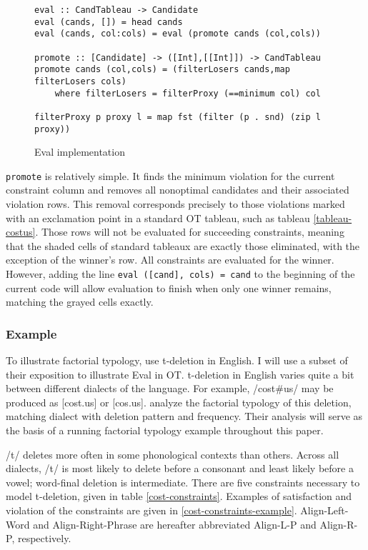 \documentclass[11pt]{article}
\begin{document}
\begin{figure}
\begin{verbatim}
eval :: CandTableau -> Candidate
eval (cands, []) = head cands
eval (cands, col:cols) = eval (promote cands (col,cols))

promote :: [Candidate] -> ([Int],[[Int]]) -> CandTableau
promote cands (col,cols) = (filterLosers cands,map filterLosers cols)
    where filterLosers = filterProxy (==minimum col) col

filterProxy p proxy l = map fst (filter (p . snd) (zip l proxy))
\end{verbatim}
  \caption{ {\sc Eval} implementation}
  \label{eval-algorithm}
\end{figure}

{\tt promote} is relatively simple. It finds the minimum violation for the
current constraint column and removes all nonoptimal candidates
and their associated violation rows. This removal corresponds
precisely to those violations marked with an exclamation point in a
standard OT tableau, such as tableau \ref{tableau-costus}. Those rows
will not be evaluated for succeeding constraints, meaning that the
shaded cells of standard tableaux are exactly those eliminated, with
the exception of the winner's row. All constraints are evaluated for
the winner. However, adding the line {\tt eval ([cand], cols) = cand}
to the beginning of the current code will allow evaluation to finish
when only one winner remains, matching the grayed cells exactly.

\subsubsection{Example}

To illustrate factorial typology,  use t-deletion
in English. I will use a subset of their exposition to illustrate {\sc
  Eval} in OT.  t-deletion in English varies quite a bit between
different dialects of the language. For example, /cost\#us/ may be
produced as [cost.us] or [cos.us].  analyze the
factorial typology of this deletion, matching dialect with deletion
pattern and frequency. Their analysis will serve as the basis of a
running factorial typology example throughout this paper.

/t/ deletes more
often in some phonological contexts than others. Across all
dialects, /t/ is most likely to delete before a consonant and least
likely before a vowel; word-final deletion is intermediate.
There are five constraints necessary to model
t-deletion, given in table \ref{cost-constraints}. Examples of
satisfaction and violation of the constraints are given in
\ref{cost-constraints-example}. {\sc Align-Left-Word} and {\sc
  Align-Right-Phrase} are hereafter abbreviated {\sc Align-L-P} and
{\sc Align-R-P}, respectively.
\end{document}

